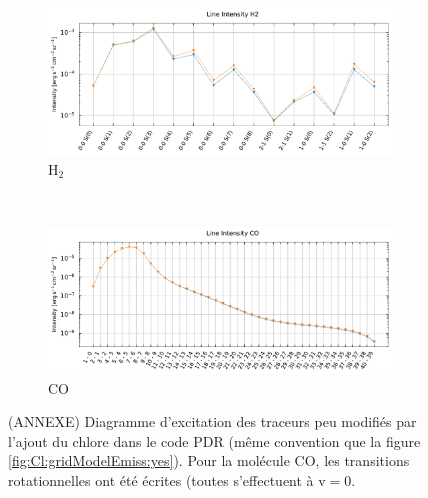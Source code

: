 \begin{figure}[!h]
    \begin{subfigure}[t]{0.49\textwidth} %
        \centering \includegraphics[trim = {0 0 0 1cm},clip,width=1\textwidth]{figure/Cl/gridModelEmiss/I_comp_H2.pdf}
        \caption{$\mathrm{H}_2$}
    \end{subfigure}
    ~ 
    \begin{subfigure}[t]{0.49\textwidth} %
        \centering \includegraphics[trim = {0 0 0 1cm},clip,width=1\textwidth]{figure/Cl/gridModelEmiss/I_comp_CO.pdf}
        \caption{$\mathrm{CO}$}
    \end{subfigure}
    
    \caption{(ANNEXE) Diagramme d'excitation des traceurs peu modifiés par l'ajout du chlore dans le code PDR (même convention que la figure \ref{fig:Cl:gridModelEmiss:yes}). Pour la molécule $\mathrm{CO}$, les transitions rotationnelles ont été écrites (toutes s'effectuent à $\mathrm{v}=0$.}
    \label{fig:Cl:gridModelEmiss:no}
\end{figure}



